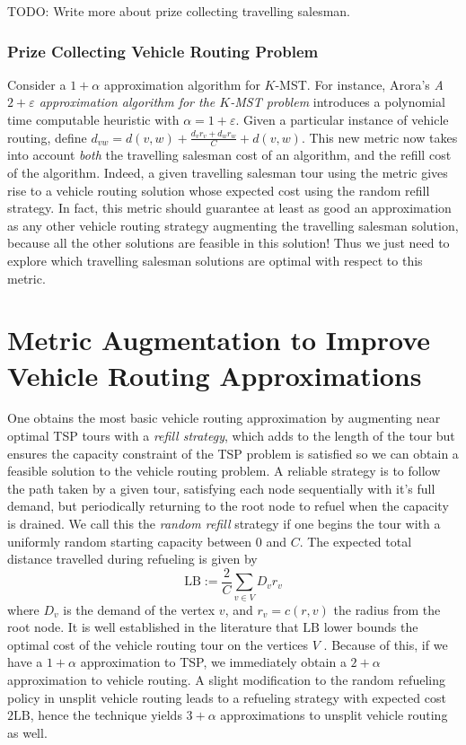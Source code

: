 \documentclass{article}
\theoremstyle{plain}
\theoremstyle{plain}
\begin{document}
TODO: Write more about prize collecting travelling salesman.

\section{Prize Collecting Vehicle Routing Problem}

Consider a $1 + \alpha$ approximation algorithm for $K$-MST. For instance, Arora's {\it A $2 + \varepsilon$ approximation algorithm for the $K$-MST problem} introduces a polynomial time computable heuristic with $\alpha = 1 + \varepsilon$. Given a particular instance of vehicle routing, define $d_{vw} = d(v,w) + \frac{d_vr_v + d_wr_w}{C} + d(v,w)$. This new metric now takes into account {\it both} the travelling salesman cost of an algorithm, and the refill cost of the algorithm. Indeed, a given travelling salesman tour using the metric gives rise to a vehicle routing solution whose expected cost using the random refill strategy. In fact, this metric should guarantee at least as good an approximation as any other vehicle routing strategy augmenting the travelling salesman solution, because all the other solutions are feasible in this solution! Thus we just need to explore which travelling salesman solutions are optimal with respect to this metric.

\part{Metric Augmentation to Improve Vehicle Routing Approximations}


One obtains the most basic vehicle routing approximation by augmenting near optimal TSP tours with a {\it refill strategy}, which adds to the length of the tour but ensures the capacity constraint of the TSP problem is satisfied so we can obtain a feasible solution to the vehicle routing problem. A reliable strategy is to follow the path taken by a given tour, satisfying each node sequentially with it's full demand, but periodically returning to the root node to refuel when the capacity is drained. We call this the {\it random refill} strategy if one begins the tour with a uniformly random starting capacity between $0$ and $C$. The expected total distance travelled during refueling is given by
%
\[ \text{LB} := \frac{2}{C} \sum_{v \in V} D_v r_v \]
%
where $D_v$ is the demand of the vertex $v$, and $r_v = c(r,v)$ the radius from the root node. It is well established in the literature that $\text{LB}$ lower bounds the optimal cost of the vehicle routing tour on the vertices $V$ \cite{RandomRefillPaper}. Because of this, if we have a $1 + \alpha$ approximation to TSP, we immediately obtain a $2 + \alpha$ approximation to vehicle routing. A slight modification to the random refueling policy in unsplit vehicle routing leads to a refueling strategy with expected cost $2 \text{LB}$, hence the technique yields $3 + \alpha$ approximations to unsplit vehicle routing as well.
\end{document}
